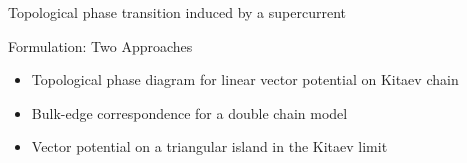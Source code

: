 \documentclass[xcolor=dvipsnames,10pt,aspectratio=169]{beamer}
\newcommand{\FO}{Formulation}
\begin{document}
  \begin{frame}{Topological phase transition induced by a supercurrent}
    \centering
  \end{frame}

  \begin{frame}{\FO: Two Approaches}
    \begin{itemize}
      \item Topological phase diagram for linear vector potential on Kitaev chain
      \item[] Bulk-edge correspondence for a double chain model
      \item Vector potential on a triangular island in the Kitaev limit
    \end{itemize}
  \end{frame}
\end{document}
